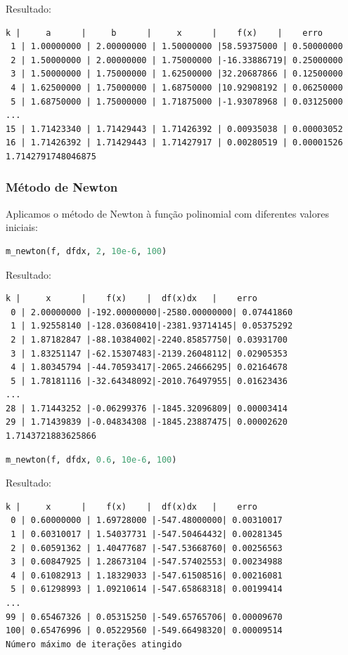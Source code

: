\documentclass{article}
\begin{document}
Resultado:
\begin{verbatim}
k |     a      |     b      |     x      |    f(x)    |    erro    
 1 | 1.00000000 | 2.00000000 | 1.50000000 |58.59375000 | 0.50000000 
 2 | 1.50000000 | 2.00000000 | 1.75000000 |-16.33886719| 0.25000000 
 3 | 1.50000000 | 1.75000000 | 1.62500000 |32.20687866 | 0.12500000 
 4 | 1.62500000 | 1.75000000 | 1.68750000 |10.92908192 | 0.06250000 
 5 | 1.68750000 | 1.75000000 | 1.71875000 |-1.93078968 | 0.03125000 
...
15 | 1.71423340 | 1.71429443 | 1.71426392 | 0.00935038 | 0.00003052 
16 | 1.71426392 | 1.71429443 | 1.71427917 | 0.00280519 | 0.00001526 
1.7142791748046875
\end{verbatim}

\subsubsection{Método de Newton}
Aplicamos o método de Newton à função polinomial com diferentes valores iniciais:

\begin{lstlisting}[language=Python]
m_newton(f, dfdx, 2, 10e-6, 100)
\end{lstlisting}

Resultado:
\begin{verbatim}
k |     x      |    f(x)    |  df(x)dx   |    erro    
 0 | 2.00000000 |-192.00000000|-2580.00000000| 0.07441860 
 1 | 1.92558140 |-128.03608410|-2381.93714145| 0.05375292 
 2 | 1.87182847 |-88.10384002|-2240.85857750| 0.03931700 
 3 | 1.83251147 |-62.15307483|-2139.26048112| 0.02905353 
 4 | 1.80345794 |-44.70593417|-2065.24666295| 0.02164678 
 5 | 1.78181116 |-32.64348092|-2010.76497955| 0.01623436 
...
28 | 1.71443252 |-0.06299376 |-1845.32096809| 0.00003414 
29 | 1.71439839 |-0.04834308 |-1845.23887475| 0.00002620 
1.7143721883625866
\end{verbatim}

\begin{lstlisting}[language=Python]
m_newton(f, dfdx, 0.6, 10e-6, 100)
\end{lstlisting}

Resultado:
\begin{verbatim}
k |     x      |    f(x)    |  df(x)dx   |    erro    
 0 | 0.60000000 | 1.69728000 |-547.48000000| 0.00310017 
 1 | 0.60310017 | 1.54037731 |-547.50464432| 0.00281345 
 2 | 0.60591362 | 1.40477687 |-547.53668760| 0.00256563 
 3 | 0.60847925 | 1.28673104 |-547.57402553| 0.00234988 
 4 | 0.61082913 | 1.18329033 |-547.61508516| 0.00216081 
 5 | 0.61298993 | 1.09210614 |-547.65868318| 0.00199414 
...
99 | 0.65467326 | 0.05315250 |-549.65765706| 0.00009670 
100| 0.65476996 | 0.05229560 |-549.66498320| 0.00009514 
Número máximo de iterações atingido
\end{verbatim}
\end{document}
